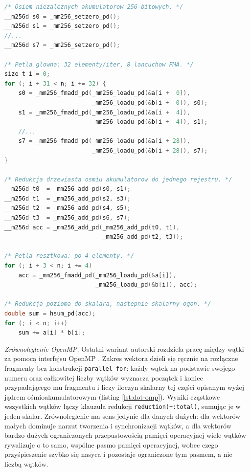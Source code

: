 \documentclass[a4paper,12pt]{book} %
\begin{document}
\begin{lstfloat}[t!]
\begin{lstlisting}[language=C, caption={Iloczyn skalarny --- rdzeń wektorowy z ośmioma niezależnymi akumulatorami (AVX2/FMA): osiem łańcuchów FMA po 32 elementy na iterację, redukcja drzewiasta, pętla resztkowa i redukcja pozioma}, label={lst:dot-akum}]
/* Osiem niezaleznych akumulatorow 256-bitowych. */
__m256d s0 = _mm256_setzero_pd();
__m256d s1 = _mm256_setzero_pd();
//...
__m256d s7 = _mm256_setzero_pd();

/* Petla glowna: 32 elementy/iter, 8 lancuchow FMA. */
size_t i = 0;
for (; i + 31 < n; i += 32) {
    s0 = _mm256_fmadd_pd(_mm256_loadu_pd(&a[i +  0]),
                         _mm256_loadu_pd(&b[i +  0]), s0);
    s1 = _mm256_fmadd_pd(_mm256_loadu_pd(&a[i +  4]),
                         _mm256_loadu_pd(&b[i +  4]), s1);
    //...
    s7 = _mm256_fmadd_pd(_mm256_loadu_pd(&a[i + 28]),
                         _mm256_loadu_pd(&b[i + 28]), s7);
}

/* Redukcja drzewiasta osmiu akumulatorow do jednego rejestru. */
__m256d t0  = _mm256_add_pd(s0, s1);
__m256d t1  = _mm256_add_pd(s2, s3);
__m256d t2  = _mm256_add_pd(s4, s5);
__m256d t3  = _mm256_add_pd(s6, s7);
__m256d acc = _mm256_add_pd(_mm256_add_pd(t0, t1),
                            _mm256_add_pd(t2, t3));

/* Petla resztkowa: po 4 elementy. */
for (; i + 3 < n; i += 4)
    acc = _mm256_fmadd_pd(_mm256_loadu_pd(&a[i]),
                          _mm256_loadu_pd(&b[i]), acc);

/* Redukcja pozioma do skalara, nastepnie skalarny ogon. */
double sum = hsum_pd(acc);
for (; i < n; i++)
    sum += a[i] * b[i];
\end{lstlisting}
\end{lstfloat}

\emph{Zrównoleglenie OpenMP.} Ostatni wariant autorski rozdziela pracę między wątki za pomocą interfejsu OpenMP \cite{openmp52}. Zakres wektora dzieli się ręcznie na rozłączne fragmenty bez konstrukcji \texttt{parallel for}: każdy wątek na podstawie swojego numeru oraz całkowitej liczby wątków wyznacza początek i koniec przypadającego mu fragmentu i liczy iloczyn skalarny tej części opisanym wyżej jądrem ośmioakumulatorowym (listing \ref{lst:dot-omp}). Wyniki cząstkowe wszystkich wątków łączy klauzula redukcji \texttt{reduction(+:total)}, sumując je w jeden skalar. Zrównoleglenie ma sens jedynie dla danych dużych: dla wektorów małych dominuje narzut tworzenia i synchronizacji wątków, a dla wektorów bardzo dużych ograniczonych przepustowością pamięci operacyjnej wiele wątków rywalizuje o to samo, wspólne pasmo pamięci operacyjnej, wobec czego przyśpieszenie szybko się nasyca i pozostaje ograniczone tym pasmem, a nie liczbą wątków.
\end{document}
